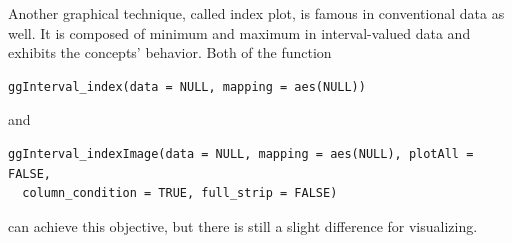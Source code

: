 \documentclass[article]{jss}
\begin{document}
Another graphical technique, called index plot, is famous in conventional data as well. It is composed of minimum and maximum in interval-valued data and exhibits the concepts' behavior. Both of the function

\begin{verbatim}
ggInterval_index(data = NULL, mapping = aes(NULL))
\end{verbatim}

and 

\begin{verbatim}
ggInterval_indexImage(data = NULL, mapping = aes(NULL), plotAll = FALSE,
  column_condition = TRUE, full_strip = FALSE)
\end{verbatim}

can achieve this objective, but there is still a slight difference for visualizing. 
\end{document}
